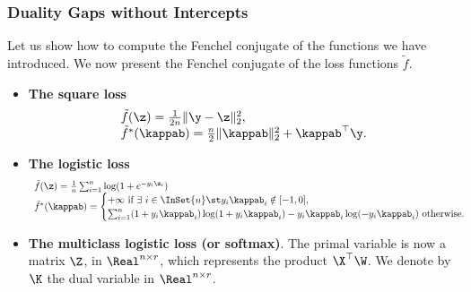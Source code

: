 \documentclass[a4paper, 11pt]{article}
\begin{document}
                                         \subsubsection{Duality Gaps without Intercepts}
                                         Let us show how to compute the Fenchel conjugate of the functions we have introduced.
                                         We now present the Fenchel conjugate of the loss functions $\tilde{f}$.
                                         \begin{itemize}
                                         \item \textbf{The square loss} 
                                         $$\begin{array}{l}
                                         \tilde{f}(\z)=\frac{1}{2n}\|\y-\z\|_2^2, \\
                                            \tilde{f}^\ast(\kappab)=\frac{n}{2}\|\kappab\|_2^2 + \kappab^\top\y.
                                            \end{array}
                                            $$
                                            \item \textbf{The logistic loss} 
                                            $$\begin{array}{l}
                                            \tilde{f}(\z)=\frac{1}{n}\sum_{i=1}^n \log(1+e^{-y_i\z_i}) \\
                                               \tilde{f}^\ast(\kappab)=\begin{cases}
                                               +\infty ~\text{if}~ \exists~i\in \InSet{n} \st y_i\kappab_i \notin [-1,0],\\
                                                  \sum_{i=1}^n(1+y_i\kappab_i)\log(1+y_i\kappab_i)-y_i\kappab_i\log(-y_i\kappab_i) ~\text{otherwise}.
                                                  \end{cases}
                                                  \end{array}
                                                  $$
                                                  \item \textbf{The multiclass logistic loss (or softmax)}. The primal variable is now a matrix $\Z$, in $\Real^{n \times r}$, which represents the product $\X^\top \W$. We denote by $\K$ the dual variable in $\Real^{n \times r}$.
                                                  $$\begin{array}{l}

\end{array}$$
\end{itemize}
\end{document}
